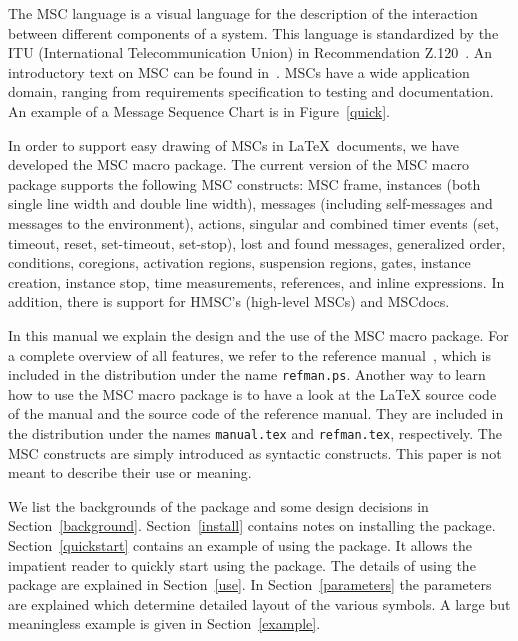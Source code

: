 \documentclass[12pt,a4paper]{article}
\newcommand{\acro}[1]{{#1}}
\newcommand{\MSC}{\acro{MSC}}
\newcommand{\HMSC}{\acro{HMSC}}
\newcommand{\MSCdoc}{\MSC{}doc}
\newcommand{\mscpack}{\MSC{} macro package}
\begin{document}
The \MSC{} language is a visual language for the description of the
interaction between different components of a system.
This language is standardized by the ITU (International
Telecommunication Union) in Recommendation Z.120~\cite{z120}. An
introductory text on \MSC{} can be found
in~\cite{RudolphGrabowskiGraubmann96}. \MSC{}s have a
wide application domain, ranging from requirements specification to
testing and documentation.
An example of a Message Sequence Chart is in Figure~\ref{quick}.

In order to support easy drawing of \MSC{}s in \LaTeX\ documents, we have
developed the \mscpack.  The current version of the \mscpack{}
supports the following \MSC{} constructs: \MSC{} frame, instances (both
single line width and double line width), messages (including
self-messages and messages to the environment), actions, singular and
combined timer events (set, timeout, reset, set-timeout, set-stop),
lost and found messages, generalized order, conditions, coregions,
activation regions, suspension regions, gates, instance creation,
instance stop, time measurements, references, and inline
expressions. In addition, there is support for \HMSC{}'s (high-level
\MSC{}s) and \MSCdoc{}s.

In this manual we explain the design and the use of the \mscpack. For
a complete overview of all features, we refer to the reference
manual~\cite{BM02}, which is included in the distribution under the
name \verb+refman.ps+. Another way to learn how to use the \mscpack{}
is to have a look at the \LaTeX{} source code of the manual and the
source code of the reference manual. They are included in the
distribution under the names \verb+manual.tex+ and \verb+refman.tex+,
respectively.  The \MSC{} constructs are simply introduced as
syntactic constructs. This paper is not meant to describe their use or
meaning.

We list the backgrounds of the package and some design decisions in
Section~\ref{background}.
Section~\ref{install} contains notes on installing the
package. Section~\ref{quickstart} contains an example of using the
package. It allows the impatient reader to quickly start using the
package. The details of using the package are explained in
Section~\ref{use}. In Section~\ref{parameters} the parameters are
explained which determine detailed layout of the various symbols.
A large but meaningless example is given in
Section~\ref{example}.
\end{document}
